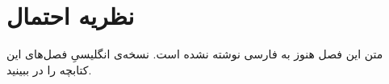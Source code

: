 \chapter{نظریه احتمال}
\label{ch:11-probability-theory-fa-01}

متن این فصل هنوز به فارسی نوشته نشده است. نسخه‌ی انگلیسیِ فصل‌های این کتابچه را در  ببینید.
